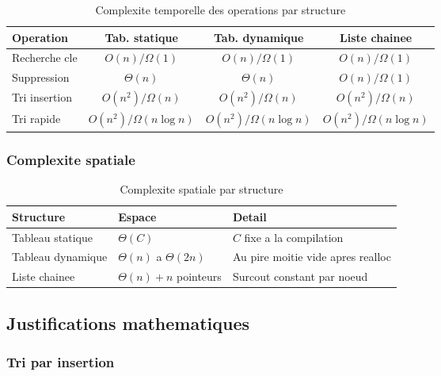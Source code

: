 \documentclass[12pt,a4paper]{article}
\begin{document}
\begin{table}[H]
\centering
\caption{Complexite temporelle des operations par structure}
\begin{threeparttable}
\begin{tabular}{lccc}
\toprule
\textbf{Operation} & \textbf{Tab. statique} & \textbf{Tab. dynamique} & \textbf{Liste chainee} \\
\midrule
Recherche cle      & $O(n)/\Omega(1)$ & $O(n)/\Omega(1)$ & $O(n)/\Omega(1)$ \\
Suppression        & $\Theta(n)$   & $\Theta(n)$         & $O(n)/\Omega(1)$ \\
Tri insertion      & $O(n^2)/\Omega(n)$ & $O(n^2)/\Omega(n)$ & $O(n^2)/\Omega(n)$ \\
Tri rapide         & $O(n^2)/\Omega(n\log n)$ & $O(n^2)/\Omega(n\log n)$ & $O(n^2)/\Omega(n\log n)$ \\
\bottomrule
\end{tabular}
\end{threeparttable}
\end{table}

\subsubsection{Complexite spatiale}

\begin{table}[H]
\centering
\caption{Complexite spatiale par structure}
\begin{tabular}{lll}
\toprule
\textbf{Structure} & \textbf{Espace} & \textbf{Detail} \\
\midrule
Tableau statique   & $\Theta(C)$       & $C$ fixe a la compilation \\
Tableau dynamique  & $\Theta(n)$ a $\Theta(2n)$ & Au pire moitie vide apres realloc \\
Liste chainee      & $\Theta(n) + n$ pointeurs & Surcout constant par noeud \\
\bottomrule
\end{tabular}
\end{table}

\subsection{Justifications mathematiques}

\subsubsection{Tri par insertion}
\end{document}

